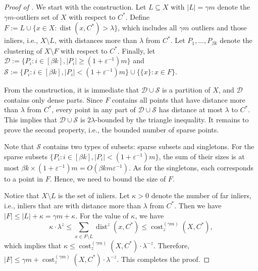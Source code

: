 \documentclass[letterpaper,11pt]{article}
\theoremstyle{plain}
\theoremstyle{definition}
\theoremstyle{remark}
\DeclareMathOperator{\cost}{cost}
\DeclareMathOperator{\dist}{dist}
\newcommand{\eps}{\varepsilon}
\newcommand{\calD}{\mathcal{D}}
\newcommand{\calS}{\mathcal{S}}
\begin{document}
\begin{proof}[Proof of ]
    We start with the construction.
    Let $L\subseteq X$ with $|L| = \gamma m$ denote the $\gamma m$-outliers set of $X$ with respect to $C^*$.
    Define $F := L\cup \{x\in X: \dist(x,C^*) > \lambda \}$,
    which includes all $\gamma m$ outliers and those inliers, i.e., $X \setminus L$, with distances more than $\lambda$ from $C^*$.
    Let $P_1,\dots, P_{\beta k}$ denote the clustering of $X\setminus F$ with respect to $C^*$.
    Finally, let $\calD:=\{P_i:i\in [\beta k], |P_i| \ge (1+\eps^{-1})m\}$ and $\calS:=\{P_i:i\in[\beta k], |P_i|<(1+\eps^{-1})m \}\cup \{\{x\}: x\in F \}$.


    From the construction, it is immediate that $\calD \cup \calS$ is a partition of $X$, and $\calD$ contains only dense parts. 
Since $F$ contains all points that have distance more than $\lambda$ from $C^*$,
    every point in any part of $\calD \cup \calS$ has distance at most $\lambda$ to $C^*$. This implies that $\calD\cup\calS$ is $2\lambda$-bounded by the triangle inequality.
It remains to prove the second property, i.e., the bounded number of sparse points.

    Note that $\calS$ contains two types of subsets: sparse subsets and singletons. For the sparse subsets $\{P_i: i\in [\beta k], |P_i|< (1+\eps^{-1})m\}$, the sum of their sizes is at most $\beta k \times (1+\eps^{-1})m = O(\beta k m \eps^{-1})$. As for the singletons, each corresponds to a point in $F$. Hence, we need to bound the size of $F$.

    Notice that $X \setminus L$ is the set of inliers.
    Let $\kappa>0$ denote the number of far inliers,
    i.e., inliers that are with distance more than $\lambda$ from $C^*$.
    Then we have $|F| \le |L| + \kappa = \gamma m + \kappa$. For the value of $\kappa$, we have 
    \begin{equation*}
        \kappa\cdot \lambda^z \le \sum_{x\in F\setminus L}\dist^z(x,C^*)\le  \cost_z^{(\gamma m)}(X,C^*),
    \end{equation*}
    which implies that $\kappa\le \cost_z^{(\gamma m)}(X,C^*)\cdot \lambda^{-z}$.
    Therefore, $|F|\le \gamma m + \cost_z^{(\gamma m)}(X,C^*)\cdot \lambda^{-z}$.
    This completes the proof.
\end{proof}
\end{document}
